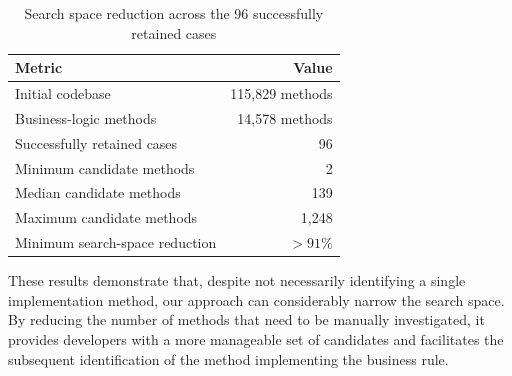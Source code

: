 \begin{table}[h]
\centering
\caption{Search space reduction across the 96 successfully retained cases}
\label{tab:search-space-reduction}
\begin{tabular}{lr}
\toprule
\textbf{Metric} & \textbf{Value} \\
\midrule
Initial codebase & 115,829 methods \\
Business-logic methods & 14,578 methods \\
Successfully retained cases & 96 \\
Minimum candidate methods & 2 \\
Median candidate methods & 139 \\
Maximum candidate methods & 1,248 \\
Minimum search-space reduction & $>91\%$ \\
\bottomrule
\end{tabular}
\end{table}

These results demonstrate that, despite not necessarily identifying a single implementation method, our approach can considerably narrow the search space. By reducing the number of methods that need to be manually investigated, it provides developers with a more manageable set of candidates and facilitates the subsequent identification of the method implementing the business rule.